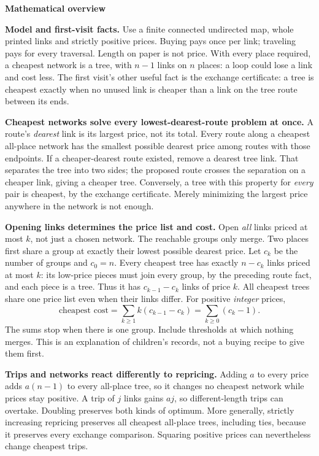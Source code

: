 \documentclass[11pt]{article}
\newcommand{\head}[1]{\par{\large\bfseries #1}\par\nobreak}
\begin{document}
\head{Mathematical overview}
\textbf{Model and first-visit facts.} Use a finite connected undirected map, whole printed links and strictly positive prices. Buying pays once per link; traveling pays for every traversal. Length on paper is not price. With every place required, a cheapest network is a tree, with $n-1$ links on $n$ places: a loop could lose a link and cost less. The first visit's other useful fact is the exchange certificate: a tree is cheapest exactly when no unused link is cheaper than a link on the tree route between its ends.

\textbf{Cheapest networks solve every lowest-dearest-route problem at once.} A route's \emph{dearest} link is its largest price, not its total. Every route along a cheapest all-place network has the smallest possible dearest price among routes with those endpoints. If a cheaper-dearest route existed, remove a dearest tree link. That separates the tree into two sides; the proposed route crosses the separation on a cheaper link, giving a cheaper tree. Conversely, a tree with this property for \emph{every} pair is cheapest, by the exchange certificate. Merely minimizing the largest price anywhere in the network is not enough.

\textbf{Opening links determines the price list and cost.} Open \emph{all} links priced at most $k$, not just a chosen network. The reachable groups only merge. Two places first share a group at exactly their lowest possible dearest price. Let $c_k$ be the number of groups and $c_0=n$. Every cheapest tree has exactly $n-c_k$ links priced at most $k$: its low-price pieces must join every group, by the preceding route fact, and each piece is a tree. Thus it has $c_{k-1}-c_k$ links of price $k$. All cheapest trees share one price list even when their links differ. For positive \emph{integer} prices,
\[
 \text{cheapest cost}=\sum_{k\ge1}k(c_{k-1}-c_k)=\sum_{k\ge0}(c_k-1).
\]
The sums stop when there is one group. Include thresholds at which nothing merges. This is an explanation of children's records, not a buying recipe to give them first.

\textbf{Trips and networks react differently to repricing.} Adding $a$ to every price adds $a(n-1)$ to every all-place tree, so it changes no cheapest network while prices stay positive. A trip of $j$ links gains $aj$, so different-length trips can overtake. Doubling preserves both kinds of optimum. More generally, strictly increasing repricing preserves all cheapest all-place trees, including ties, because it preserves every exchange comparison. Squaring positive prices can nevertheless change cheapest trips.
\end{document}
